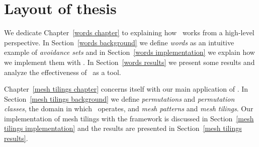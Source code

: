


\section{Layout of thesis}

We dedicate Chapter~\ref{words chapter} to explaining how \CombCov\ works from a 
high-level perspective. In Section~\ref{words background} we define \emph{words}
as an intuitive example of \emph{avoidance sets} and in Section~\ref{words 
implementation} we explain how we implement them with \CombCov. In 
Section~\ref{words results} we present some results and analyze the 
effectiveness of \CombCov\ as a tool.

Chapter~\ref{mesh tilings chapter} concerns itself with our main application of 
\CombCov. In Section~\ref{mesh tilings background} we define \emph{permutations}
and \emph{permutation classes}, the domain in which \Struct\ operates, and 
\emph{mesh patterns} and \emph{mesh tilings}. Our implementation of mesh tilings
with  the framework is discussed in Section~\ref{mesh tilings implementation} 
and the results are presented in Section~\ref{mesh tilings results}.
